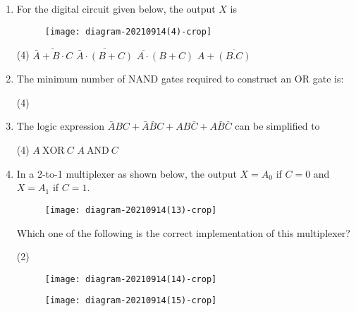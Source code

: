 \begin{enumerate}
	{	}
	\begin{tasks}(4)
		\task[\textbf{A.}] $(A+B) \overline{A B}$
		\task[\textbf{B.}]  $A \bar{B}+B \bar{A}$
		\task[\textbf{C.}] $(A+B)(\bar{A}+\bar{B})$
		\task[\textbf{D.}] $(A+B) A B$
	\end{tasks}
	\item For the digital circuit given below, the output $X$ is
	{	}
	\begin{figure}[H]
		\centering
		\texttt{[image: diagram-20210914(4)-crop]}
	\end{figure}
	\begin{tasks}(4)
		\task[\textbf{A.}] $\overline{\bar{A}+B \cdot C}$
		\task[\textbf{B.}] $\overline{\bar{A} \cdot(B+C)}$
		\task[\textbf{C.}] $\overline{A \cdot}(B+C)$
		\task[\textbf{D.}] $A+\overline{(B . C)}$
	\end{tasks}
	\item The minimum number of NAND gates required to construct an OR gate is:
	{	}
	\begin{tasks}(4)
	\end{tasks}
	\item The logic expression $\bar{A} B C+\bar{A} \bar{B} C+A B \bar{C}+A \bar{B} \bar{C}$ can be simplified to
	{	}
	\begin{tasks}(4)
		\task[\textbf{A.}] $A\  \mathrm{XOR} \ C$
		\task[\textbf{B.}] $A \ \mathrm{AND} \ C$
	\end{tasks}
	\item In a 2-to-1 multiplexer as shown below, the output $X=A_{0}$ if $C=0$ and $X=A_{1}$ if $C=1$.\\
	\begin{figure}[H]
		\centering
		\texttt{[image: diagram-20210914(13)-crop]}
	\end{figure}
	Which one of the following is the correct implementation of this multiplexer?
	{	}
	\begin{tasks}(2)
		\task[\textbf{A.}] \begin{figure}[H]
			\centering
			\texttt{[image: diagram-20210914(14)-crop]}
		\end{figure}
		\task[\textbf{B.}] \begin{figure}[H]
			\centering
			\texttt{[image: diagram-20210914(15)-crop]}

\end{figure}
\end{tasks}
\end{enumerate}
